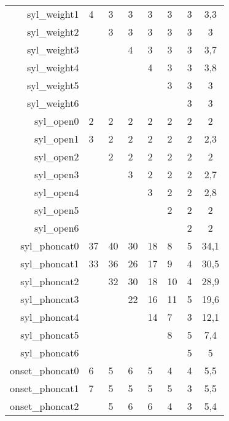 \begin{longtable}{|r|llllll|c|}
    syl\_weight1      & 4    & 3    & 3    & 3    & 3    & 3    & 3,3      \\
    syl\_weight2      & ~    & 3    & 3    & 3    & 3    & 3    & 3        \\
    syl\_weight3      & ~    & ~    & 4    & 3    & 3    & 3    & 3,7      \\
    syl\_weight4      & ~    & ~    & ~    & 4    & 3    & 3    & 3,8      \\
    syl\_weight5      & ~    & ~    & ~    & ~    & 3    & 3    & 3        \\
    syl\_weight6      & ~    & ~    & ~    & ~    & ~    & 3    & 3        \\
    syl\_open0        & 2    & 2    & 2    & 2    & 2    & 2    & 2        \\
    syl\_open1        & 3    & 2    & 2    & 2    & 2    & 2    & 2,3      \\
    syl\_open2        & ~    & 2    & 2    & 2    & 2    & 2    & 2        \\
    syl\_open3        & ~    & ~    & 3    & 2    & 2    & 2    & 2,7      \\
    syl\_open4        & ~    & ~    & ~    & 3    & 2    & 2    & 2,8      \\
    syl\_open5        & ~    & ~    & ~    & ~    & 2    & 2    & 2        \\
    syl\_open6        & ~    & ~    & ~    & ~    & ~    & 2    & 2        \\
    syl\_phoncat0     & 37   & 40   & 30   & 18   & 8    & 5    & 34,1     \\
    syl\_phoncat1     & 33   & 36   & 26   & 17   & 9    & 4    & 30,5     \\
    syl\_phoncat2     & ~    & 32   & 30   & 18   & 10   & 4    & 28,9     \\
    syl\_phoncat3     & ~    & ~    & 22   & 16   & 11   & 5    & 19,6     \\
    syl\_phoncat4     & ~    & ~    & ~    & 14   & 7    & 3    & 12,1     \\
    syl\_phoncat5     & ~    & ~    & ~    & ~    & 8    & 5    & 7,4      \\
    syl\_phoncat6     & ~    & ~    & ~    & ~    & ~    & 5    & 5        \\
    onset\_phoncat0   & 6    & 5    & 6    & 5    & 4    & 4    & 5,5      \\
    onset\_phoncat1   & 7    & 5    & 5    & 5    & 5    & 3    & 5,5      \\
    onset\_phoncat2   & ~    & 5    & 6    & 6    & 4    & 3    & 5,4      \\

\end{longtable}
